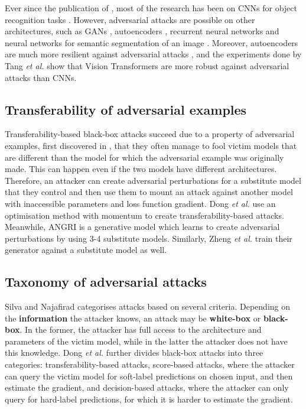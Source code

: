 Ever since the publication of \cite{szegedy2014intriguing}, most of the research has been on CNNs for object recognition tasks \cite{akhtar}. However, adversarial attacks are possible on other architectures, such as GANs \cite{kos_attacks_on_gans}, autoencoders \cite{tabacof_attacks_autoencoders}, recurrent neural networks \cite{papernot_attacks_rnns} and neural networks for semantic segmentation of an image \cite{Metzen_2017_ICCV}. Moreover, autoencoders are much more resilient against adversarial attacks \cite{tabacof_attacks_autoencoders}, and the experiments done by Tang \textit{et al.} \cite{robustart} show that Vision Transformers are more robust against adversarial attacks than CNNs.

\subsection{Transferability of adversarial examples}

Transferability-based black-box attacks succeed due to a property of adversarial examples, first discovered in \cite{szegedy2014intriguing}, that they often manage to fool victim models that are different than the model for which the adversarial example was originally made. This can happen even if the two models have different architectures. Therefore, an attacker can create adversarial perturbations for a substitute model that they control and then use them to mount an attack against another model with inaccessible parameters and loss function gradient. Dong \textit{et al.} \cite{mim} use an optimisation method with momentum to create transferability-based attacks. Meanwhile, ANGRI \cite{upset_angri} is a generative model which learns to create adversarial perturbations by using 3-4 substitute models. Similarly, Zheng \textit{et al.} \cite{zheng_black_box_GAN} train their generator against a substitute model as well.

\subsection{Taxonomy of adversarial attacks}

Silva and Najafirad \cite{silva_survey} categorises attacks based on several criteria. Depending on the \textbf{information} the attacker knows, an attack may be \textbf{white-box} or \textbf{black-box}. In the former, the attacker has full access to the architecture and parameters of the victim model, while in the latter the attacker does not have this knowledge. Dong \textit{et al.} \cite{dong2020benchmarking} further divides black-box attacks into three categories: transferability-based attacks, score-based attacks, where the attacker can query the victim model for soft-label predictions on chosen input, and then estimate the gradient, and decision-based attacks, where the attacker can only query for hard-label predictions, for which it is harder to estimate the gradient.

